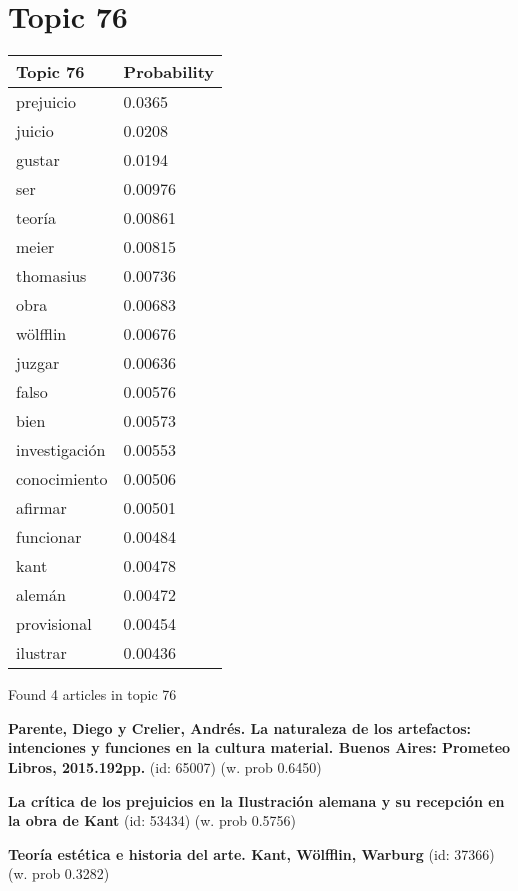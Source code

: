 \documentclass{article}
\begin{document}
\section*{Topic 76}\vfill
\begin{tabular}{ll}
\toprule
      Topic 76 & Probability \\
\midrule
     prejuicio &      0.0365 \\
        juicio &      0.0208 \\
        gustar &      0.0194 \\
           ser &     0.00976 \\
        teoría &     0.00861 \\
         meier &     0.00815 \\
     thomasius &     0.00736 \\
          obra &     0.00683 \\
      wölfflin &     0.00676 \\
        juzgar &     0.00636 \\
         falso &     0.00576 \\
          bien &     0.00573 \\
 investigación &     0.00553 \\
  conocimiento &     0.00506 \\
       afirmar &     0.00501 \\
     funcionar &     0.00484 \\
          kant &     0.00478 \\
        alemán &     0.00472 \\
   provisional &     0.00454 \\
      ilustrar &     0.00436 \\
\bottomrule
\end{tabular}

\vfill
Found 4 articles in topic 76
\vfill

\textbf{Parente, Diego y Crelier, Andrés. La naturaleza de los artefactos: intenciones y funciones en la cultura material. Buenos Aires: Prometeo Libros, 2015.192pp.} (id: 65007)
 (w. prob 0.6450)
\vfill

\textbf{La crítica de los prejuicios en la Ilustración alemana y su recepción en la obra de Kant} (id: 53434)
 (w. prob 0.5756)
\vfill

\textbf{Teoría estética e historia del arte. Kant, Wölfflin, Warburg} (id: 37366)
 (w. prob 0.3282)

\vfill
\newpage


\centering
\thispagestyle{empty}
\end{document}
